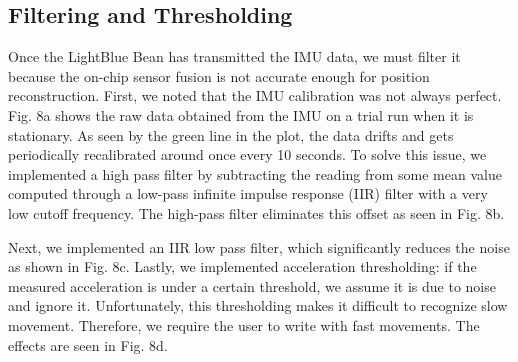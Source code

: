 \documentclass[10pt,journal]{IEEEtran}
\begin{document}
\subsection{Filtering and Thresholding}
  Once the LightBlue Bean has transmitted the IMU data, we must filter it because the on-chip sensor fusion is not accurate enough for position reconstruction. First, we noted that the IMU calibration was not always perfect. Fig. 8a shows the raw data obtained from the IMU on a trial run when it is stationary. As seen by the green line in the plot, the data drifts and gets periodically recalibrated around once every 10 seconds. To solve this issue, we implemented a high pass filter by subtracting the reading from some mean value computed through a low-pass infinite impulse response (IIR) filter with a very low cutoff frequency. The high-pass filter eliminates this offset as seen in Fig. 8b.
\par Next, we implemented an IIR low pass filter, which significantly reduces the noise as shown in Fig. 8c.
  Lastly, we implemented acceleration thresholding: if the measured acceleration is under a certain threshold, we assume it is due to noise and ignore it. Unfortunately, this thresholding makes it difficult to recognize slow movement. Therefore, we require the user to write with fast movements. The effects are seen in Fig. 8d.
\end{document}
